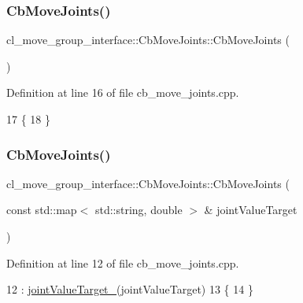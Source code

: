 \subsubsection{\texorpdfstring{Cb\+Move\+Joints()}{CbMoveJoints()}\hspace{0.1cm}{\footnotesize\ttfamily [1/2]}}
{\footnotesize\ttfamily cl\+\_\+move\+\_\+group\+\_\+interface\+::\+Cb\+Move\+Joints\+::\+Cb\+Move\+Joints (\begin{DoxyParamCaption}{ }\end{DoxyParamCaption})}



Definition at line 16 of file cb\+\_\+move\+\_\+joints.\+cpp.


\begin{DoxyCode}
17   \{
18   \}
\end{DoxyCode}
\mbox{\label{classcl__move__group__interface_1_1CbMoveJoints_a3b79fb14e34ffdb5cd6ffafdaa6b8965}} 
\subsubsection{\texorpdfstring{Cb\+Move\+Joints()}{CbMoveJoints()}\hspace{0.1cm}{\footnotesize\ttfamily [2/2]}}
{\footnotesize\ttfamily cl\+\_\+move\+\_\+group\+\_\+interface\+::\+Cb\+Move\+Joints\+::\+Cb\+Move\+Joints (\begin{DoxyParamCaption}\item[{const std\+::map$<$ std\+::string, double $>$ \&}]{joint\+Value\+Target }\end{DoxyParamCaption})}



Definition at line 12 of file cb\+\_\+move\+\_\+joints.\+cpp.


\begin{DoxyCode}
12                                                                               : 
      \hyperlink{classcl__move__group__interface_1_1CbMoveJoints_a8103f7c923a34d9bf5a2c374ff88a277}{jointValueTarget\_}(jointValueTarget)
13   \{
14   \}
\end{DoxyCode}


